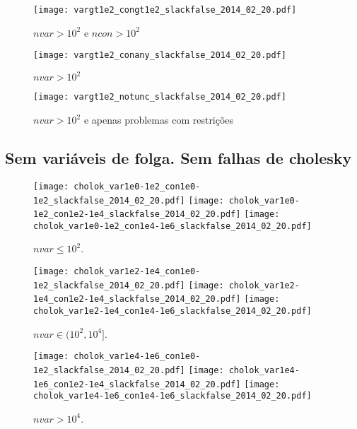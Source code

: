 \documentclass{article}
\begin{document}
\begin{figure}[H]
\centering
\texttt{[image: vargt1e2\_congt1e2\_slackfalse\_2014\_02\_20.pdf]}
\caption{ $nvar > 10^2$ e $ncon > 10^2$ }
\label{fig:both_medium_and_big}
\end{figure}

\begin{figure}[H]
\centering
\texttt{[image: vargt1e2\_conany\_slackfalse\_2014\_02\_20.pdf]}
\caption{ $nvar > 10^2$ }
\label{fig:nvar_medium_and_big}
\end{figure}

\begin{figure}[H]
\centering
\texttt{[image: vargt1e2\_notunc\_slackfalse\_2014\_02\_20.pdf]}
\caption{ $nvar > 10^2$ e apenas problemas com restrições }
\label{fig:nvar_medium_and_big_not_unc}
\end{figure}

\newpage
\subsection{Sem variáveis de folga. Sem falhas de cholesky}

\begin{figure}[H]
\centering
\texttt{[image: cholok\_var1e0-1e2\_con1e0-1e2\_slackfalse\_2014\_02\_20.pdf]}
\texttt{[image: cholok\_var1e0-1e2\_con1e2-1e4\_slackfalse\_2014\_02\_20.pdf]}
\texttt{[image: cholok\_var1e0-1e2\_con1e4-1e6\_slackfalse\_2014\_02\_20.pdf]}
\caption{ $nvar \leq 10^2$. }
\label{fig:nvar_small}
\end{figure}
\begin{figure}[H]
\centering
\texttt{[image: cholok\_var1e2-1e4\_con1e0-1e2\_slackfalse\_2014\_02\_20.pdf]}
\texttt{[image: cholok\_var1e2-1e4\_con1e2-1e4\_slackfalse\_2014\_02\_20.pdf]}
\texttt{[image: cholok\_var1e2-1e4\_con1e4-1e6\_slackfalse\_2014\_02\_20.pdf]}
\caption{ $nvar \in (10^2,10^4]$. }
\label{fig:nvar_medium}
\end{figure}
\begin{figure}[H]
\centering
\texttt{[image: cholok\_var1e4-1e6\_con1e0-1e2\_slackfalse\_2014\_02\_20.pdf]}
\texttt{[image: cholok\_var1e4-1e6\_con1e2-1e4\_slackfalse\_2014\_02\_20.pdf]}
\texttt{[image: cholok\_var1e4-1e6\_con1e4-1e6\_slackfalse\_2014\_02\_20.pdf]}
\caption{ $nvar > 10^4$. }
\label{fig:nvar_big}
\end{figure}
\end{document}

